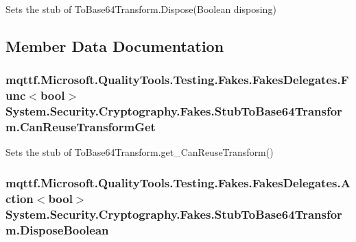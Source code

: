 Sets the stub of To\-Base64\-Transform.\-Dispose(\-Boolean disposing)



\subsection{Member Data Documentation}
\hypertarget{class_system_1_1_security_1_1_cryptography_1_1_fakes_1_1_stub_to_base64_transform_aa34e057e5fb9cb4e4750ffa65c87b710}{
\subsubsection[{Can\-Reuse\-Transform\-Get}]{\setlength{\rightskip}{0pt plus 5cm}mqttf.\-Microsoft.\-Quality\-Tools.\-Testing.\-Fakes.\-Fakes\-Delegates.\-Func$<$bool$>$ System.\-Security.\-Cryptography.\-Fakes.\-Stub\-To\-Base64\-Transform.\-Can\-Reuse\-Transform\-Get}}\label{class_system_1_1_security_1_1_cryptography_1_1_fakes_1_1_stub_to_base64_transform_aa34e057e5fb9cb4e4750ffa65c87b710}


Sets the stub of To\-Base64\-Transform.\-get\-\_\-\-Can\-Reuse\-Transform()

\hypertarget{class_system_1_1_security_1_1_cryptography_1_1_fakes_1_1_stub_to_base64_transform_afc2a3974c34681ef69514342b22b177f}{
\subsubsection[{Dispose\-Boolean}]{\setlength{\rightskip}{0pt plus 5cm}mqttf.\-Microsoft.\-Quality\-Tools.\-Testing.\-Fakes.\-Fakes\-Delegates.\-Action$<$bool$>$ System.\-Security.\-Cryptography.\-Fakes.\-Stub\-To\-Base64\-Transform.\-Dispose\-Boolean}}\label{class_system_1_1_security_1_1_cryptography_1_1_fakes_1_1_stub_to_base64_transform_afc2a3974c34681ef69514342b22b177f}


